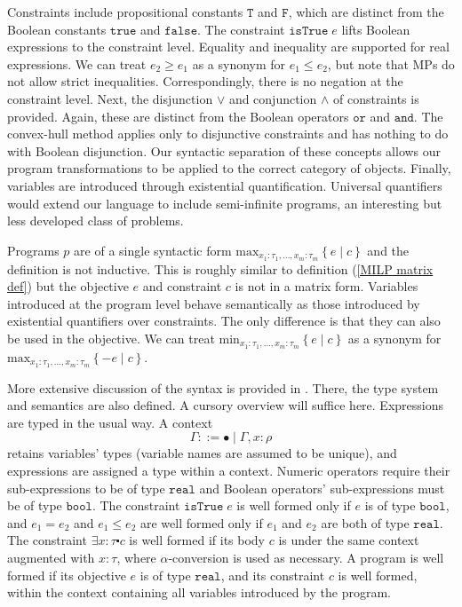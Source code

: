 \documentclass[preprint]{sigplanconf}%
\theoremstyle{remark}
\begin{document}
Constraints include propositional constants $\mathtt{T}$ and $\mathtt{F}$,
which are distinct from the Boolean constants $\mathtt{true}$ and
$\mathtt{false}$. The constraint $\mathtt{isTrue}\;e$ lifts Boolean
expressions to the constraint level. Equality and inequality are supported for
real expressions. We can treat $e_{2}\geq e_{1}$ as a synonym for $e_{1}\leq
e_{2}$, but note that MPs do not allow strict inequalities. Correspondingly,
there is no negation at the constraint level. Next, the disjunction $\vee$ and
conjunction $\wedge$ of constraints is provided. Again, these are distinct
from the Boolean operators $\mathtt{or}$ and $\mathtt{and}$. The convex-hull
method applies only to disjunctive constraints and has nothing to do with
Boolean disjunction. Our syntactic separation of these concepts allows our
program transformations to be applied to the correct category of objects.
Finally, variables are introduced through existential quantification.
Universal quantifiers would extend our language to include semi-infinite
programs, an interesting but less developed class of problems.

Programs $p$ are of a single syntactic form $\mathrm{max}_{x_{1}:\tau
_{1},\ldots,x_{m}:\tau_{m}}\left\{  e\mid c\right\}  $ and the definition is
not inductive. This is roughly similar to definition (\ref{MILP matrix def})
but the objective $e$ and constraint $c$ is not in a matrix form. Variables
introduced at the program level behave semantically as those introduced by
existential quantifiers over constraints. The only difference is that they can
also be used in the objective. We can treat $\mathrm{min}_{x_{1}:\tau
_{1},\ldots,x_{m}:\tau_{m}}\left\{  e\mid c\right\}  $ as a synonym for
$\mathrm{max}_{x_{1}:\tau_{1},\ldots,x_{m}:\tau_{m}}\left\{  -e\mid c\right\}
$.

More extensive discussion of the syntax is provided in \cite{a3000}. There,
the type system and semantics are also defined. A cursory overview will
suffice here. Expressions are typed in the usual way. A context%
\begin{equation}
\Gamma::=\bullet\mid\Gamma,x\!:\!\rho
\end{equation}
retains variables' types (variable names are assumed to be unique), and
expressions are assigned a type within a context. Numeric operators require
their sub-expressions to be of type $\mathtt{real}$ and Boolean operators'
sub-expressions must be of type $\mathtt{bool}$. The constraint
$\mathtt{isTrue}\;e$ is well formed only if $e$ is of type $\mathtt{bool}$,
and $e_{1}=e_{2}$ and $e_{1}\leq e_{2}$ are well formed only if $e_{1}$ and
$e_{2}$ are both of type $\mathtt{real}$. The constraint $\exists
x\!:\!\tau\centerdot c$ is well formed if its body $c$ is under the same
context augmented with $x\!:\!\tau$, where $\alpha$-conversion is used as
necessary. A program is well formed if its objective $e$ is of type
$\mathtt{real}$, and its constraint $c$ is well formed, within the context
containing all variables introduced by the program.
\end{document}
